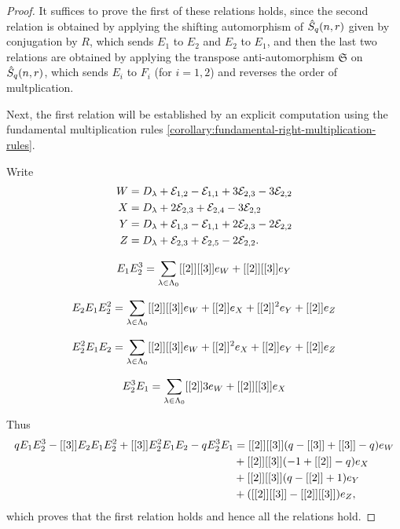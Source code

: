 \documentclass[a4paper, 11pt, twoside]{report}
\begin{document}
\begin{proof}
It suffices to prove the first of these relations holds, since the second relation is obtained by applying the shifting automorphism of $\hat{S}_q(n,r)$ given by conjugation by $R$, which sends $E_1$ to $E_2$ and $E_2$ to $E_1$, and then the last two relations are obtained by applying the transpose anti-automorphism $\mathfrak{S}$ on $\hat{S}_q(n,r)$, which sends $E_i$ to $F_i$ (for $i=1,2$) and reverses the order of multplication.

Next, the first relation will be established by an explicit computation using the fundamental multiplication rules \ref{corollary:fundamental-right-multiplication-rules}.

Write
\begin{align*}
W &= D_{\lambda} +\mathcal{E}_{1,2} -\mathcal{E}_{1,1} +3\mathcal{E}_{2,3} -3\mathcal{E}_{2,2}\\
X &= D_{\lambda} +2\mathcal{E}_{2,3} +\mathcal{E}_{2,4} -3\mathcal{E}_{2,2}\\
Y &= D_{\lambda} +\mathcal{E}_{1,3} -\mathcal{E}_{1,1} +2\mathcal{E}_{2,3} -2\mathcal{E}_{2,2}\\
Z &= D_{\lambda} +\mathcal{E}_{2,3} +\mathcal{E}_{2,5} -2\mathcal{E}_{2,2}.
\end{align*}

\begin{equation*}
E_1 E_2^3 = \sum_{\lambda\in\Lambda_0{}} [[2]][[3]]e_W +[[2]][[3]]e_Y
\end{equation*}

\begin{equation*}
E_2 E_1 E_2^2 = \sum_{\lambda\in\Lambda_0{}} [[2]][[3]]e_W +[[2]]e_X +[[2]]^2e_Y + [[2]]e_Z
\end{equation*}

\begin{equation*}
E_2^2 E_1 E_2 = \sum_{\lambda\in\Lambda_0{}} [[2]][[3]]e_W +[[2]]^2e_X +[[2]]e_Y +[[2]]e_Z
\end{equation*}

\begin{equation*}
E_2^3 E_1 = \sum_{\lambda\in\Lambda_0{}} [[2]]{3}e_W +[[2]][[3]]e_X
\end{equation*}

Thus
\begin{align*}
qE_1 E_2^3 -[[3]]E_2E_1E_2^2 + [[3]]E_2^2E_1E_2 -qE_2^3E_1
&= [[2]][[3]](q -[[3]] +[[3]] -q)e_W\\
&+ [[2]][[3]](-1 +[[2]] -q)e_X\\
&+ [[2]][[3]](q -[[2]] +1)e_Y\\
&+ ([[2]][[3]]-[[2]][[3]])e_Z,
\end{align*}
which proves that the first relation holds and hence all the relations hold.
\end{proof}
\end{document}
